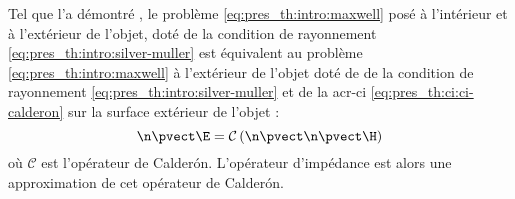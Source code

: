 Tel que l'a démontré \cite[Theorem 1., p.~1042]{lafitte_diffraction_1998}, le problème \eqref{eq:pres_th:intro:maxwell}  posé à l'intérieur et à l'extérieur de l'objet, doté de la condition de rayonnement \eqref{eq:pres_th:intro:silver-muller} est équivalent au problème \eqref{eq:pres_th:intro:maxwell} à l'extérieur de l'objet doté de de la condition de rayonnement \eqref{eq:pres_th:intro:silver-muller} et de la \gls{acr-ci} \eqref{eq:pres_th:ci:ci-calderon} sur la surface extérieur de l'objet : 
\begin{equation}
\label{eq:pres_th:ci:ci-calderon}
  \n \pvect \E = \mathcal{C}\left(\n \pvect \n \pvect \H\right)
\end{equation}
où $ \mathcal{C}$ est l'opérateur de Calderón. L'opérateur d'impédance est alors une approximation de cet opérateur de Calderón.



